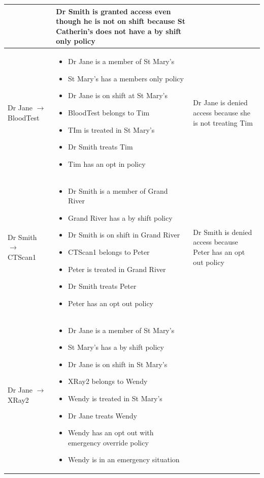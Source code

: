 \documentclass[conference]{IEEEtran}
\begin{document}
\begin{table}[!t]
{\begin{tabular}{m{3cm}|m{9cm}|m{5cm}}
\begin{itemize}
                       \end{itemize} & Dr Smith is granted access even though he is not on shift because St Catherin's does not have a by shift only policy\\
\hline
Dr Jane $\rightarrow$ BloodTest & \begin{itemize}
                           \item Dr Jane is a member of St Mary's
\item St Mary's has a members only policy
\item Dr Jane is on shift at St Mary's
\item BloodTest belongs to Tim
\item TIm is treated in St Mary's
\item Dr Smith treats Tim
\item Tim has an opt in policy
                          \end{itemize} & Dr Jane is denied access because she is not treating Tim\\
\hline
Dr Smith $\rightarrow$ CTScan1 & \begin{itemize}
                                  \item Dr Smith is a member of Grand River
\item Grand River has a by shift policy
\item Dr Smith is on shift in Grand River
\item CTScan1 belongs to Peter
\item Peter is treated in Grand River
\item Dr Smith treats Peter
\item Peter has an opt out policy
                                 \end{itemize} & Dr Smith is denied access because Peter has an opt out policy\\
\hline
Dr Jane $\rightarrow$ XRay2 & \begin{itemize}
                               \item Dr Jane is a member of St Mary's
\item St Mary's has a by shift policy
\item Dr Jane is on shift in St Mary's
\item XRay2 belongs to Wendy
\item Wendy is treated in St Mary's
\item Dr Jane treats Wendy
\item Wendy has an opt out with emergency override policy
\item Wendy is in an emergency situation

\end{itemize}
\end{tabular}}
\end{table}
\end{document}
